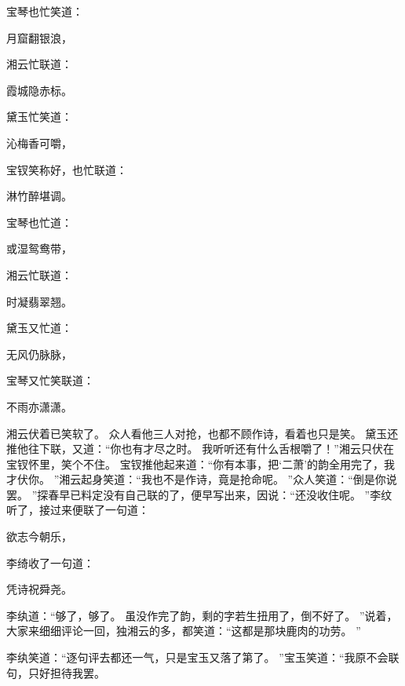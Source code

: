 宝琴也忙笑道：\par
\hop
月窟翻银浪，
\par
\hop
湘云忙联道：\par
\hop
霞城隐赤标。
\par
\hop
黛玉忙笑道：\par
\hop
沁梅香可嚼，
\par
\hop
宝钗笑称好，也忙联道：\par
\hop
淋竹醉堪调。
\par
\hop
宝琴也忙道：\par
\hop
或湿鸳鸯带，\par
\hop
湘云忙联道：\par
\hop
时凝翡翠翘。
\par
\hop
黛玉又忙道：\par
\hop
无风仍脉脉，\par
\hop
宝琴又忙笑联道：\par
\hop
不雨亦潇潇。
\par
\hop
湘云伏着已笑软了。
众人看他三人对抢，也都不顾作诗，看着也只是笑。
黛玉还推他往下联，又道：“你也有才尽之时。
我听听还有什么舌根嚼了！”湘云只伏在宝钗怀里，笑个不住。
宝钗推他起来道：“你有本事，把‘二萧’的韵全用完了，我才伏你。
”湘云起身笑道：“我也不是作诗，竟是抢命呢。
”众人笑道：“倒是你说罢。
”探春早已料定没有自己联的了，便早写出来，因说：“还没收住呢。
”李纹听了，接过来便联了一句道：\par
\hop
欲志今朝乐，\par
\hop
李绮收了一句道：\par
\hop
凭诗祝舜尧。
\par
\hop
李纨道：“够了，够了。
虽没作完了韵，剩的字若生扭用了，倒不好了。
”说着，大家来细细评论一回，独湘云的多，都笑道：“这都是那块鹿肉的功劳。
”\par
李纨笑道：“逐句评去都还一气，只是宝玉又落了第了。
”宝玉笑道：“我原不会联句，只好担待我罢。
